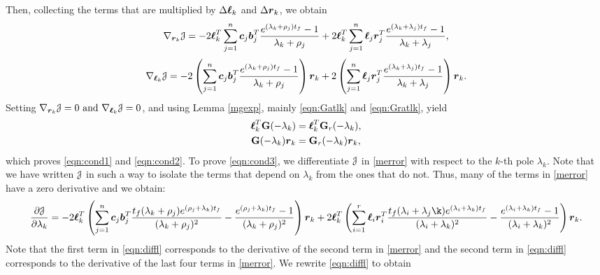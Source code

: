 \documentclass[twocolumn]{autart}
\begin{document}
Then, collecting  the terms that are multiplied by $\Delta\boldsymbol{\ell}_{k}$ and $\Delta\boldsymbol{r}_{k}$, we obtain 
\begin{dmath*}
\nabla_{\rc_{k} }\J =-2\lc_k^T\sum_{j=1}^n\cc_j\bb_j^T\dfrac{e^{(\lambda_k+\rho_j){\tf}}-1}{\lambda_k+\rho_j}+2\lc_k^T\sum_{j=1}^n\lc_j\rc_j^T\dfrac{e^{(\lambda_k+\lambda_j){\tf}}-1}{\lambda_k+\lambda_j},
\end{dmath*}
\begin{dmath*}
\nabla_{\lc_{k} }\J=-2\left (\sum_{j=1}^n\cc_j\bb_j^T\dfrac{e^{(\lambda_k+\rho_j){\tf}}-1}{\lambda_k+\rho_j}\right)\rc_k+2\left(\sum_{j=1}^n\lc_j\rc_j^T\dfrac{e^{(\lambda_k+\lambda_j){\tf}}-1}{\lambda_k+\lambda_j}\right)\rc_k.\\
\end{dmath*}
Setting $\nabla_{\boldsymbol{r}_{k} }\EuScript{J}=0   \text{ and }\nabla_{\boldsymbol{\ell}_{k} }\EuScript{J}=0 $, and using Lemma \ref{mgexp}, mainly
\eqref{eqn:Gatlk} and \eqref{eqn:Gratlk}, yield 
\begin{align*}
\lc_k^T\G(-\lambda_k)&=\lc_k^T\G_r(-\lambda_k), \\ %
\G(-\lambda_k)\rc_k&=\G_r(-\lambda_k)\rc_k,
\end{align*}
which proves \eqref{eqn:cond1} and \eqref{eqn:cond2}. To prove \eqref{eqn:cond3},  we differentiate $\EuScript{J}$ in \eqref{merror}  with respect to the $k$-th pole $\lambda_k$. Note that we have written $\EuScript{J}$ in such a way to isolate the terms that depend on $\lambda_k$ from the ones that do not. Thus, many of the terms in \eqref{merror} have a zero derivative and we obtain:
\begin{dmath}\label{eqn:diffl}
\pder[\J]{\lambda_k}=-2\lc_k^T \left(\sum_{j=1}^n \cc_j\bb_j^T \dfrac{{\tf}(\lambda_k+\rho_j)e^{(\rho_j+\lambda_k){\tf}}} {(\lambda_k+\rho_j)^2}     -\dfrac       {e^{(\rho_j+\lambda_k){\tf}}-1}{(\lambda_k+\rho_j)^2}\right)\rc_k 
+2\lc_k^T \left(\sum^r_{i=1} \lc_i\rc_i^T\dfrac{{\tf}(\lambda_i+\lambda_j\k)e^{(\lambda_i+\lambda_k){\tf}}}  {(\lambda_i+\lambda_k)^2}         -\dfrac{e^{(\lambda_i+\lambda_k){\tf}}-1}{(\lambda_i+\lambda_k)^2}\right)\rc_k.
\end{dmath}
{\color{red}
Note that the first term in \eqref{eqn:diffl} corresponds to the derivative of the second term in \eqref{merror} and the second term in \eqref{eqn:diffl} corresponds to the derivative of the last four terms in \eqref{merror}.}
We rewrite \eqref{eqn:diffl} to obtain 
\end{document}
